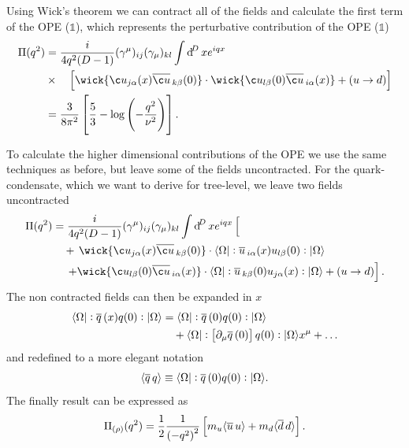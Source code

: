 \documentclass[../../index.tex]{subfiles}
\begin{document}
Using Wick's theorem we can contract all of the fields and calculate the first
term of the OPE ($\mathbb{1}$), which represents the perturbative contribution
of the OPE ($\mathbb{1}$)
\begin{equation}
  \begin{split}
    \Pi(q^2) &= \frac{i}{4q^2(D-1)} (\gamma^\mu)_{ij} (\gamma_\mu)_{kl} \int \dif^D x e^{iqx} \\
    &\times\quad\left[ \wick{ \c u_{j \alpha}(x) \anti{\c u}_{k \beta}(0)} \cdot
      \wick{\c u_{l \beta}(0) \anti{\c u}_{i \alpha}(x)} + (u \to d)
    \right] \\
    &= \frac{3}{8\pi^2} \left[ \frac{5}{3} - \log\left( -\frac{q^2}{\nu^2}
      \right) \right].
  \end{split}
\end{equation}

To calculate the higher dimensional contributions of the OPE we use the same
techniques as before, but leave some of the fields uncontracted. For the
quark-condensate, which we want to derive for tree-level, we leave two fields
uncontracted
\begin{equation}
  \begin{split}
    \Pi(q^2) &= \frac{i}{4q^2(D-1)} (\gamma^\mu)_{ij} (\gamma_\mu)_{kl} \int \dif^D x e^{iqx} \left[ \phantom{\wick{ \c u_{j \alpha}(x) \anti{\c u}_{k \beta}(0)}} \right.\\
    &\quad+\,\wick{ \c u_{j \alpha}(x) \anti{\c u}_{k \beta}(0)} \cdot \langle \Omega \vert : \anti{u}_{i \alpha}(x) u_{l \beta} (0) :\vert \Omega \rangle \\
    &\quad\,\left.+\wick{\c u_{l \beta}(0) \anti{\c u}_{i \alpha}(x)} \cdot
      \langle \Omega \vert: \anti{u}_{k \beta}(0) u_{j \alpha}(x) : \vert \Omega
      \rangle + (u \to d) \right].
  \end{split}
\end{equation}
The non contracted fields can then be expanded in $x$
\begin{equation}
  \begin{split}
    \langle \Omega \vert: \overline{q}\,(x) q(0):\vert \Omega \rangle &= \langle\Omega\vert: \overline{q}\,(0) q(0): \vert\Omega\rangle\\
    &\quad+ \langle\Omega\vert:\left[ \partial_\mu \overline{q}\,(0) \right]
    q(0):\vert\Omega\rangle x^\mu + \dots
  \end{split}
\end{equation}
and redefined to a more elegant notation
\begin{equation}
  \langle \overline{q}\,q \rangle \equiv \langle\Omega\vert: \overline{q}\,(0) q(0):\vert\Omega\rangle.
\end{equation}
The finally result can be expressed as
\begin{equation}
  \Pi_{(\rho)}(q^2) = \frac{1}{2} \frac{1}{\left(-q^2\right)^2} \left[ m_u\langle \overline{u}\, u \rangle + m_d \langle \overline{d}\, d \rangle\right].
\end{equation}
\end{document}
